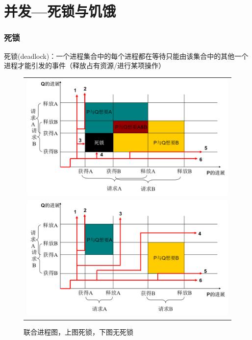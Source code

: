 
\section{并发---死锁与饥饿}
\subsubsection{死锁}
死锁(deadlock)：一个进程集合中的每个进程都在等待只能由该集合中的其他一个进程才能引发的事件（释放占有资源/进行某项操作）
\begin{figure}[H]
    \centering
    \begin{tabular}{c}
    \includegraphics[width=0.6\linewidth]{fig/deadlock.png}\\
    \includegraphics[width=0.6\linewidth]{fig/deadlock2.png}
    \end{tabular}
    \caption*{联合进程图，上图死锁，下图无死锁}
\end{figure}

